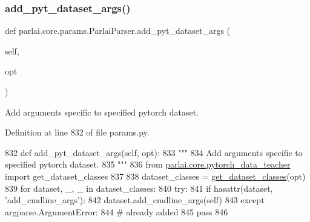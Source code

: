 \subsubsection{\texorpdfstring{add\+\_\+pyt\+\_\+dataset\+\_\+args()}{add\_pyt\_dataset\_args()}}
{\footnotesize\ttfamily def parlai.\+core.\+params.\+Parlai\+Parser.\+add\+\_\+pyt\+\_\+dataset\+\_\+args (\begin{DoxyParamCaption}\item[{}]{self,  }\item[{}]{opt }\end{DoxyParamCaption})}

\begin{DoxyVerb}Add arguments specific to specified pytorch dataset.
\end{DoxyVerb}
 

Definition at line 832 of file params.\+py.


\begin{DoxyCode}
832     \textcolor{keyword}{def }add\_pyt\_dataset\_args(self, opt):
833         \textcolor{stringliteral}{"""}
834 \textcolor{stringliteral}{        Add arguments specific to specified pytorch dataset.}
835 \textcolor{stringliteral}{        """}
836         \textcolor{keyword}{from} \hyperlink{namespaceparlai_1_1core_1_1pytorch__data__teacher}{parlai.core.pytorch\_data\_teacher} \textcolor{keyword}{import} get\_dataset\_classes
837 
838         dataset\_classes = \hyperlink{namespaceparlai_1_1core_1_1pytorch__data__teacher_acd56d9ac5d68831c1e91690f26eb2328}{get\_dataset\_classes}(opt)
839         \textcolor{keywordflow}{for} dataset, \_, \_ \textcolor{keywordflow}{in} dataset\_classes:
840             \textcolor{keywordflow}{try}:
841                 \textcolor{keywordflow}{if} hasattr(dataset, \textcolor{stringliteral}{'add\_cmdline\_args'}):
842                     dataset.add\_cmdline\_args(self)
843             \textcolor{keywordflow}{except} argparse.ArgumentError:
844                 \textcolor{comment}{# already added}
845                 \textcolor{keywordflow}{pass}
846 
\end{DoxyCode}
\mbox{\label{classparlai_1_1core_1_1params_1_1ParlaiParser_a037989eca768126b981270b2bdf06b0c}} 

